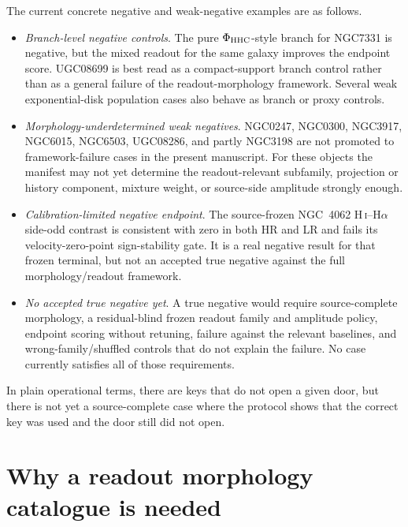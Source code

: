 \documentclass[11pt]{article}
\begin{document}
The current concrete negative and weak-negative examples are as follows.
\begin{itemize}[leftmargin=*]
\item \emph{Branch-level negative controls}.  The pure
\(\Phi_{\rm HHC}\)-style branch for NGC7331 is negative, but the mixed readout
for the same galaxy improves the endpoint score.  UGC08699 is best read as a
compact-support branch control rather than as a general failure of the
readout-morphology framework.  Several weak exponential-disk population cases
also behave as branch or proxy controls.
\item \emph{Morphology-underdetermined weak negatives}.  NGC0247, NGC0300,
NGC3917, NGC6015, NGC6503, UGC08286, and partly NGC3198 are not promoted to
framework-failure cases in the present manuscript.  For these objects the
manifest may not yet determine the readout-relevant subfamily, projection or
history component, mixture weight, or source-side amplitude strongly enough.
\item \emph{Calibration-limited negative endpoint}.  The source-frozen
NGC~4062 H\,\textsc{i}--H$\alpha$ side-odd contrast is consistent with zero in
both HR and LR and fails its velocity-zero-point sign-stability gate.  It is a
real negative result for that frozen terminal, but not an accepted true
negative against the full morphology/readout framework.
\item \emph{No accepted true negative yet}.  A true negative would require
source-complete morphology, a residual-blind frozen readout family and
amplitude policy, endpoint scoring without retuning, failure against the
relevant baselines, and wrong-family/shuffled controls that do not explain the
failure.  No case currently satisfies all of those requirements.
\end{itemize}

In plain operational terms, there are keys that do not open a given door, but
there is not yet a source-complete case where the protocol shows that the
correct key was used and the door still did not open.

\section{Why a readout morphology catalogue is needed}
\end{document}
